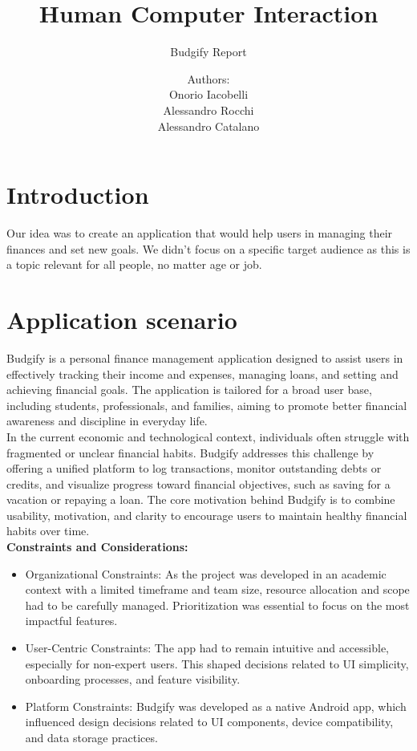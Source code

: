 \documentclass[a4paper,12pt]{article}
\title{Human Computer Interaction}
\author{Budgify Report}
\date{Authors:\\ Onorio Iacobelli\\Alessandro Rocchi\\Alessandro Catalano}
\begin{document}
\maketitle

\tableofcontents

\section{Introduction}
Our idea was to create an application that would help users in managing their finances and set new goals. We didn't focus on a specific target audience as this is a topic relevant for all people, no matter age or job.

\section{Application scenario}
Budgify is a personal finance management application designed to assist users in effectively tracking their income and expenses, managing loans, and setting and achieving financial goals. The application is tailored for a broad user base, including students, professionals, and families, aiming to promote better financial awareness and discipline in everyday life.
\vspace{0.5cm}\\
In the current economic and technological context, individuals often struggle with fragmented or unclear financial habits. Budgify addresses this challenge by offering a unified platform to log transactions, monitor outstanding debts or credits, and visualize progress toward financial objectives, such as saving for a vacation or repaying a loan. The core motivation behind Budgify is to combine usability, motivation, and clarity to encourage users to maintain healthy financial habits over time.
\vspace{0.5cm}\\
\textbf{Constraints and Considerations:}
\begin{itemize}
    \item Organizational Constraints: As the project was developed in an academic context with a limited timeframe and team size, resource allocation and scope had to be carefully managed. Prioritization was essential to focus on the most impactful features.
    \item User-Centric Constraints: The app had to remain intuitive and accessible, especially for non-expert users. This shaped decisions related to UI simplicity, onboarding processes, and feature visibility.
    \item Platform Constraints: Budgify was developed as a native Android app, which influenced design decisions related to UI components, device compatibility, and data storage practices.
\end{itemize}
\end{document}
